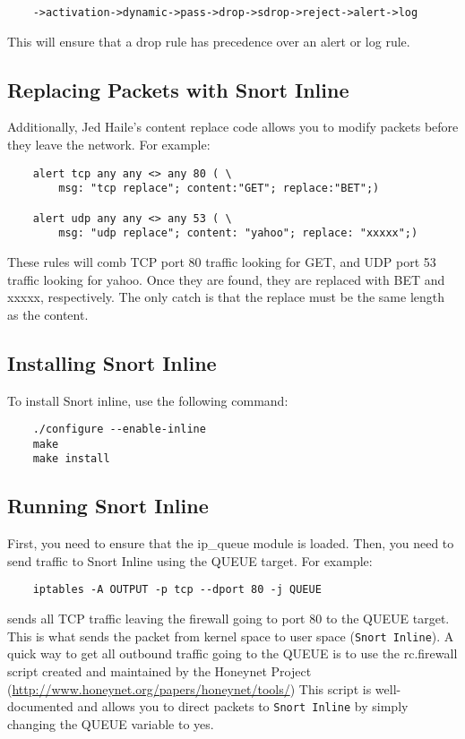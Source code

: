 \documentclass[english]{report}
\begin{document}
\begin{verbatim}
    ->activation->dynamic->pass->drop->sdrop->reject->alert->log
\end{verbatim}

This will ensure that a drop rule has precedence over an alert or log rule.

\subsection{Replacing Packets with Snort Inline}
\label{ReplaceInline}

Additionally, Jed Haile's content replace code allows you to modify packets
before they leave the network.  For example:

\begin{verbatim}
    alert tcp any any <> any 80 ( \
        msg: "tcp replace"; content:"GET"; replace:"BET";)

    alert udp any any <> any 53 ( \
        msg: "udp replace"; content: "yahoo"; replace: "xxxxx";)
\end{verbatim}

These rules will comb TCP port 80 traffic looking for GET, and UDP port 53
traffic looking for yahoo.  Once they are found, they are replaced with BET and
xxxxx, respectively.  The only catch is that the replace must be the same
length as the content.

\subsection{Installing Snort Inline}
\label{InlineInstall}
To install Snort inline, use the following command:
\begin{verbatim}
    ./configure --enable-inline
    make
    make install
\end{verbatim} 

\subsection{Running Snort Inline}

First, you need to ensure that the ip\_queue module is loaded.  Then, you need
to send traffic to Snort Inline using the QUEUE target.  For example:

\begin{verbatim}
    iptables -A OUTPUT -p tcp --dport 80 -j QUEUE
\end{verbatim}

sends all TCP traffic leaving the firewall going to port 80 to the QUEUE
target.  This is what sends the packet from kernel space to user space
(\texttt{Snort Inline}).  A quick way to get all outbound traffic going to the
QUEUE is to use the rc.firewall script created and maintained by the Honeynet
Project (\url{http://www.honeynet.org/papers/honeynet/tools/}) This script is
well-documented and allows you to direct packets to \texttt{Snort Inline} by
simply changing the QUEUE variable to yes.
\end{document}
